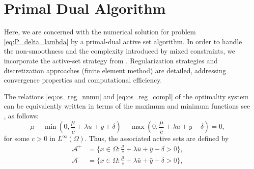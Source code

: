 \documentclass[11pt,a4paper]{amsart}
\newcommand{\om}{\Omega}
\begin{document}
\section{Primal Dual Algorithm}
Here, we are concerned with the numerical solution for problem \eqref{eq:P_delta_lambda} by a primal-dual active set algorithm. In order to handle the non-smoothness and the complexity introduced by mixed constraints, we incorporate the active-set strategy from \cite{meyprftro07}. Regularization strategies and discretization approaches (finite element method) are detailed, addressing convergence properties and computational efficiency.

The relations \eqref{eq:os_reg_nnmu} and \eqref{eq:os_reg_compl} of the optimality system can be equivalently written in terms of the maximum and minimum functions see \cite[(2.11)]{hint07},  as follows:
\begin{equation}\label{eq:mu_equation}
    \mu -\min (0, \frac{\mu}{c} + \lambda \bar u +\bar y+\delta) - \max (0, \frac{\mu}{c} + \lambda \bar u +\bar y-\delta)=0,
\end{equation} 
for some $c>0$  in $L^\infty(\om)$. Thus, the associated active sets are defined by
\begin{subequations}
 \begin{align}
    \mathcal{A}^+  &= \{x\in\om: \frac{\mu}{c} + \lambda \bar u +\bar y-\delta>0  \},\\
     \mathcal{A}^- &= \{x\in\om: \frac{\mu}{c} + \lambda \bar u +\bar y+\delta>0  \},
\end{align}   
\end{subequations}
\end{document}
